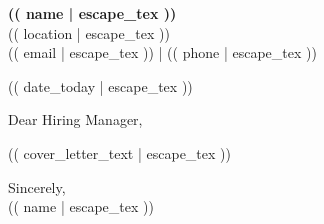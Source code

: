 \documentclass[letterpaper,11pt]{article}
\newcommand{\boldrule}{\noindent\makebox[\linewidth]{\rule{\textwidth}{1pt}}}
\begin{document}
\begin{raggedright}

\begin{center}
    \Large\textbf{(( name | escape_tex ))} \\
    \vspace{0.5em}
    (( location | escape_tex )) \\
    (( email | escape_tex )) | (( phone | escape_tex ))
\end{center}

\vspace{1em}
\boldrule
\vspace{2em}

(( date_today | escape_tex ))

\vspace{2em}

Dear Hiring Manager,

\vspace{1em}

(( cover_letter_text | escape_tex ))

\vspace{2em}

Sincerely, \\
\vspace{1em}
(( name | escape_tex ))

\end{raggedright}
\end{document}
